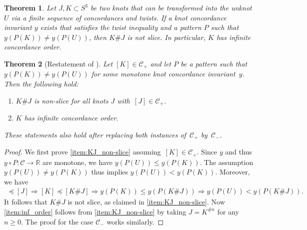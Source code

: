 \documentclass[10pt,a4paper]{amsart}
\newtheorem{theorem}{Theorem}
\newcommand{\CC}{\mathcal{C}}
\begin{document}
\begin{theorem}\label{thm:twist_ineq}
Let $J, K\subset S^3$ be two knots that can be transformed into the unknot~$U$ via a finite sequence of concordances and twists. 
If a knot concordance invariant $y$ exists that satisfies the twist inequality and a pattern $P$ such that ${y(P(K)) \neq y(P(U))}$, then $K \# J$ is not slice. 
In particular, $K$ has infinite concordance order.
\end{theorem}

\begin{theorem}[{Restatement of }]\label{thm:main_detailed}
Let $[K]\in \CC_+$ and let $P$ be a pattern such that
$y(P(K)) \neq y(P(U))$ for some monotone knot concordance invariant~$y$. Then the following hold:
\begin{enumerate}[label=(\alph*)]
\item $K \# J$ is non-slice for all knots $J$ with~$[J]\in \CC_+$. \label{item:KJ_non-slice}
\item $K$ has infinite concordance order. \label{item:inf_order}
\end{enumerate}
These statements also hold after replacing both instances of~$\CC_+$ by~$\CC_-$. 
\end{theorem}

\begin{proof}
We first prove \ref{item:KJ_non-slice} assuming~$[K]\in \CC_+$. Since $y$ and thus $y \circ P\colon\CC\to\mathbb{R}$ are monotone, we have $y(P(U)) \leq y(P(K))$. The assumption $y(P(U)) \neq y(P(K))$ thus implies $y(P(U)) < y(P(K))$. 
Moreover, we have
\begin{align*}
    [U] \preceq [J]
    \Rightarrow 
    [K] \preceq [K \# J]
    \Rightarrow
    y(P(K)) \leq y(P(K\# J))
    \Rightarrow
    y(P(U)) < y(P(K\# J)).
\end{align*}
It follows that $K\# J$ is not slice, as claimed in \ref{item:KJ_non-slice}. Now \ref{item:inf_order} follows from \ref{item:KJ_non-slice} by taking $J = K^{\#n}$ for any~$n \geq 0$.
The proof for the case $\CC_-$ works similarly. 
\end{proof}
\end{document}
